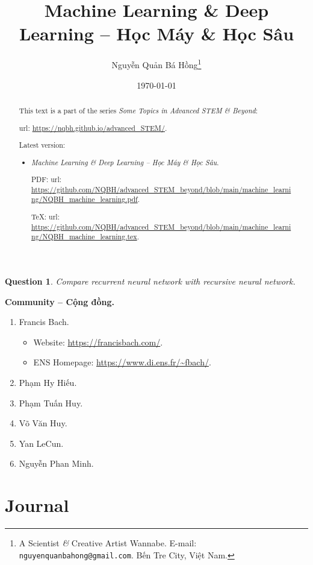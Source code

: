 \documentclass{article}
\title{Machine Learning \& Deep Learning -- Học Máy \& Học Sâu}
\author{Nguyễn Quản Bá Hồng\footnote{A Scientist {\it\&} Creative Artist Wannabe. E-mail: {\tt nguyenquanbahong@gmail.com}. Bến Tre City, Việt Nam.}}
\date{\today}
\newtheorem{question}{Question}
\begin{document}
\maketitle
\begin{abstract}
	This text is a part of the series {\it Some Topics in Advanced STEM \& Beyond}:
	
	{\sc url}: \url{https://nqbh.github.io/advanced_STEM/}.
	
	Latest version:
	\begin{itemize}
		\item {\it Machine Learning \& Deep Learning -- Học Máy \& Học Sâu}.
		
		PDF: {\sc url}: \url{https://github.com/NQBH/advanced_STEM_beyond/blob/main/machine_learning/NQBH_machine_learning.pdf}.
		
		\TeX: {\sc url}: \url{https://github.com/NQBH/advanced_STEM_beyond/blob/main/machine_learning/NQBH_machine_learning.tex}.
	\end{itemize}
\end{abstract}
\tableofcontents


\begin{question}
	Compare recurrent neural network with  recursive neural network.
\end{question}
\noindent\textbf{\textsf{Community -- Cộng đồng.}}
\begin{enumerate}
	\item {\sc Francis Bach}.
	\begin{itemize}
		\item Website: \url{https://francisbach.com/}.
		\item ENS Homepage: \url{https://www.di.ens.fr/~fbach/}.
	\end{itemize}
	\item {\sc Phạm Hy Hiếu}.
	\item {\sc Phạm Tuấn Huy.}
	\item {\sc Võ Văn Huy}.
	\item {\sc Yan LeCun}.
	\item {\sc Nguyễn Phan Minh}.
\end{enumerate}


\section{Journal}
\end{document}
